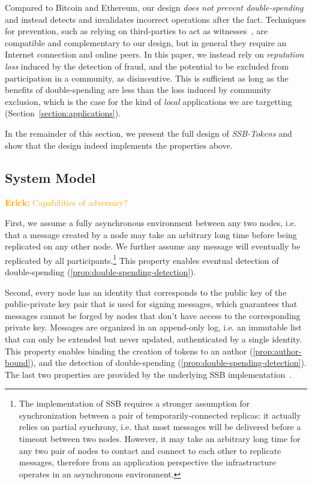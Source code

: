 \documentclass[sigplan,screen,10pt]{acmart}
\newcommand\el[1]{\textcolor{orange}{{\bf Erick: }#1}}
\newcommand\ssbtokens[0]{\textit{SSB-Tokens} }
\begin{document}
Compared to Bitcoin and Ethereum, our design \textit{does not prevent double-spending} and instead detects and invalidates incorrect operations after the fact. Techniques for prevention, such as relying on third-parties to act as witnesses~\cite{guerraoui2021consensus,otte2020trustchain}, are compatible and complementary to our design, but in general they require an Internet connection and online peers. In this paper, we instead rely on \textit{reputation loss} induced by the detection of fraud, and the potential to be excluded from participation in a community, as disincentive. This is sufficient as long as the benefits of double-spending are less than the loss induced by community exclusion, which is the case for the kind of \textit{local} applications we are targetting (Section~\ref{section:applications}).

In the remainder of this section, we present the full design of \ssbtokens and show that the design indeed implements the properties above. 


\subsection{System Model}
\label{section:system-model}

\el{Capabilities of adversary?}

First, we assume a fully asynchronous environment between any two nodes, i.e. that a message created by a node may take an arbitrary long time before being replicated on any other node. We further assume any message will eventually be replicated by all participants.\footnote{The implementation of SSB requires a stronger assumption for synchronization between a pair of temporarily-connected replicas: it actually relies on partial synchrony, i.e. that most messages will be delivered before a timeout between two nodes. However, it may take an arbitrary long time for any two pair of nodes to contact and connect to each other to replicate messages, therefore from an application perspective the infrastructure operates in an asynchronous environment.} This property enables eventual detection of double-spending (\ref{prop:double-spending-detection}).

Second, every node has an identity that corresponds to the public key of the public-private key pair that is used for signing messages, which guarantees that messages cannot be forged by nodes that don't have access to the corresponding private key. Messages are organized in an append-only log, i.e. an immutable list that can only be extended but never updated, authenticated by a single identity. This property enables binding the creation of tokens to an author (\ref{prop:author-bound}), and the detection of double-spending (\ref{prop:double-spending-detection}). The last two properties are provided by the underlying SSB implementation~\cite{kermarrec2020gossiping}.
\end{document}

